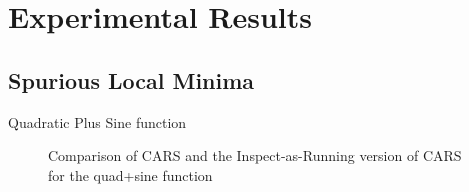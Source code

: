 \documentclass[sn-mathphys,Numbered]{sn-jnl}
\theoremstyle{thmstyleone}
\theoremstyle{thmstyletwo}
\theoremstyle{thmstylethree}
\begin{document}
\section{Experimental Results}
\subsection{Spurious Local Minima}
Quadratic Plus Sine function 
\begin{figure}
    \centering
    \caption{Comparison of CARS and the Inspect-as-Running version of CARS for the quad+sine function}
    \label{fig:Convex plus sine}
\end{figure}
\end{document}
